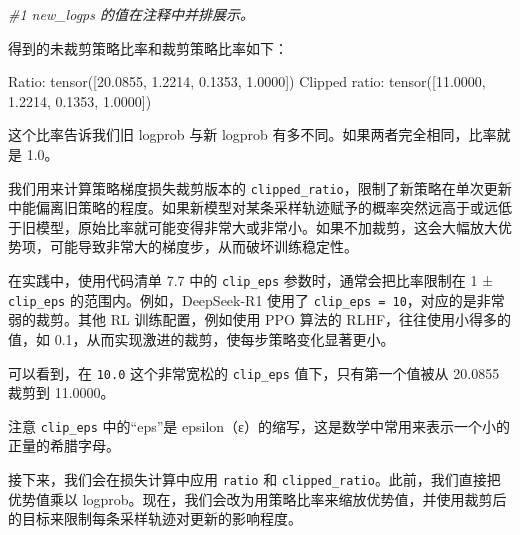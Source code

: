 {\noindent\small\textit{\#1 new\_logps 的值在注释中并排展示。}\par}

得到的未裁剪策略比率和裁剪策略比率如下：

\begin{codebox}
Ratio:         tensor([20.0855,  1.2214,  0.1353,  1.0000])
Clipped ratio: tensor([11.0000,  1.2214,  0.1353,  1.0000])
\end{codebox}

这个比率告诉我们旧 logprob 与新 logprob 有多不同。如果两者完全相同，比率就是 1.0。

我们用来计算策略梯度损失裁剪版本的 \texttt{clipped\_ratio}，限制了新策略在单次更新中能偏离旧策略的程度。如果新模型对某条采样轨迹赋予的概率突然远高于或远低于旧模型，原始比率就可能变得非常大或非常小。如果不加裁剪，这会大幅放大优势项，可能导致非常大的梯度步，从而破坏训练稳定性。

在实践中，使用代码清单 7.7 中的 \texttt{clip\_eps} 参数时，通常会把比率限制在 1 ± \texttt{clip\_eps} 的范围内。例如，DeepSeek-R1 使用了 \texttt{clip\_eps = 10}，对应的是非常弱的裁剪。其他 RL 训练配置，例如使用 PPO 算法的 RLHF，往往使用小得多的值，如 0.1，从而实现激进的裁剪，使每步策略变化显著更小。

可以看到，在 \texttt{10.0} 这个非常宽松的 \texttt{clip\_eps} 值下，只有第一个值被从 20.0855 裁剪到 11.0000。

\begin{myWarning}{注意}
 \texttt{clip\_eps} 中的“eps”是 epsilon（ε）的缩写，这是数学中常用来表示一个小的正量的希腊字母。\end{myWarning}

接下来，我们会在损失计算中应用 \texttt{ratio} 和 \texttt{clipped\_ratio}。此前，我们直接把优势值乘以 logprob。现在，我们会改为用策略比率来缩放优势值，并使用裁剪后的目标来限制每条采样轨迹对更新的影响程度。

